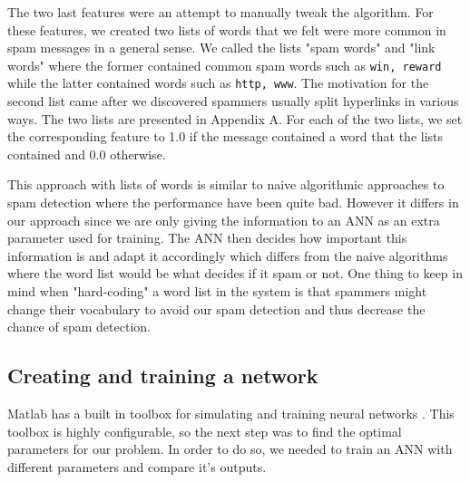     The two last features were an attempt to manually tweak the algorithm.
    For these features, we created two lists of words that we felt were more
    common in spam messages in a general sense. We called the lists "spam
    words" and "link words" where the former contained common spam words such
    as \texttt{win, reward} while the latter contained words such as
    \texttt{http, www}. The motivation for the second list came after we
    discovered spammers usually split hyperlinks in various ways.
    The two lists are presented in Appendix A. For each of the
    two lists, we set the corresponding feature to 1.0 if the
    message contained a word that the lists contained and 0.0 otherwise.
	
	This approach with lists of words is similar to naive algorithmic approaches 
	to spam detection where the performance have been quite bad. However it differs
	in our approach since we are only giving the information to an ANN as an extra parameter
	used for training. The ANN then decides how important this information is and adapt it accordingly
	which differs from the naive algorithms where the word list would be what decides if it spam or not.
    One thing to keep in mind when "hard-coding" a word list in the system is
    that spammers might change their vocabulary to avoid our spam detection and
    thus decrease the chance of spam detection.    
  \subsection{Creating and training a network}


    Matlab has a built in toolbox for simulating and training neural networks
    \cite{matlab-nn}. 
    This toolbox is highly configurable, so the next step was to find the
    optimal parameters for our problem. In order to do so, we needed to train
    an ANN with different parameters and compare it's outputs. 
    
